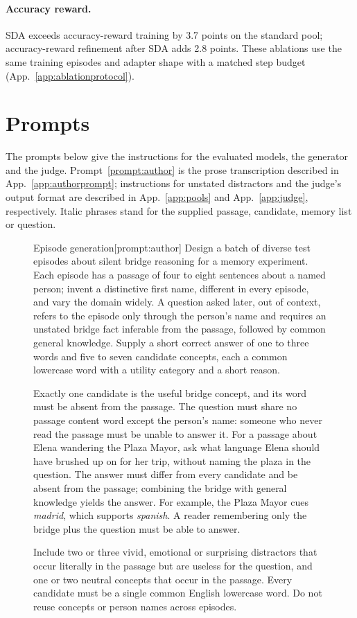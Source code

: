 

\paragraph{Accuracy reward.}
SDA exceeds accuracy-reward training by 3.7 points on the standard pool;
accuracy-reward refinement after SDA adds 2.8 points. These ablations
use the same training episodes and adapter shape with a matched step
budget (App.~\ref{app:ablationprotocol}).
\section{Prompts}
\label{app:promptlist}

The prompts below give the instructions for the evaluated models, the
generator and the judge. Prompt~\ref{prompt:author} is the prose
transcription described in App.~\ref{app:authorprompt}; instructions for
unstated distractors and the judge's output format are described in
App.~\ref{app:pools} and App.~\ref{app:judge}, respectively.
Italic phrases stand for the supplied passage, candidate, memory list or
question.

\begin{figure}[tp]
\begin{sdabox}[prompt]{Episode generation}[prompt:author]
Design a batch of diverse test episodes about silent bridge reasoning
for a memory experiment. Each episode has a passage of four to eight
sentences about a named person; invent a distinctive first name,
different in every episode, and vary the domain widely. A question
asked later, out of context, refers to the episode only through the
person's name and requires an unstated bridge fact inferable from the
passage, followed by common general knowledge. Supply a short correct
answer of one to three words and five to seven candidate concepts,
each a common lowercase word with a utility category and a short reason.

Exactly one candidate is the useful bridge concept, and its word must
be absent from the passage. The question must share no passage content
word except the person's name: someone who never read the passage
must be unable to answer it. For a passage about Elena wandering the
Plaza Mayor, ask what language Elena should have brushed up on for her
trip, without naming the plaza in the question. The answer must differ
from every candidate and be absent from the passage; combining the
bridge with general knowledge yields the answer. For example, the
Plaza Mayor cues \emph{madrid}, which supports \emph{spanish}. A reader
remembering only the bridge plus the question must be able to answer.

Include two or three vivid, emotional or surprising distractors that
occur literally in the passage but are useless for the question, and
one or two neutral concepts that occur in the passage. Every candidate
must be a single common English lowercase word. Do not reuse concepts
or person names across episodes.
\end{sdabox}
\end{figure}

